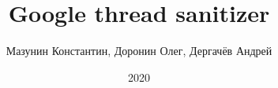 \title{Google thread sanitizer}
\author{Мазунин Константин, Доронин Олег, Дергачёв Андрей}
\date{2020}

\maketitle

\clearpage
